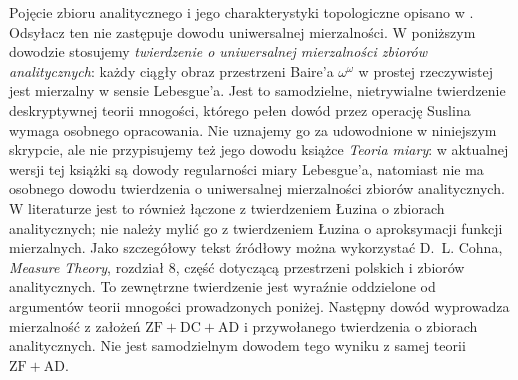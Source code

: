 \begin{uwaga}
\label{rem:ad-analytic-input}
Pojęcie zbioru analitycznego i jego charakterystyki topologiczne opisano w . Odsyłacz ten nie zastępuje dowodu uniwersalnej mierzalności.
W poniższym dowodzie stosujemy \emph{twierdzenie
o uniwersalnej mierzalności zbiorów analitycznych}:
każdy ciągły obraz przestrzeni Baire'a $\omega^\omega$
w prostej rzeczywistej jest mierzalny w sensie
Lebesgue'a. Jest to samodzielne, nietrywialne
twierdzenie deskryptywnej teorii mnogości,
którego pełen dowód przez operację Suslina
wymaga osobnego opracowania. Nie uznajemy go
za udowodnione w niniejszym skrypcie, ale nie
przypisujemy też jego dowodu książce \emph{Teoria miary}:
w aktualnej wersji tej książki są dowody regularności
miary Lebesgue'a, natomiast nie ma osobnego dowodu
twierdzenia o uniwersalnej mierzalności zbiorów analitycznych.
W literaturze jest to również łączone z twierdzeniem
Łuzina o zbiorach analitycznych; nie należy mylić go
z twierdzeniem Łuzina o aproksymacji funkcji mierzalnych.
Jako szczegółowy tekst źródłowy można wykorzystać
D.~L. Cohna, \emph{Measure Theory}, rozdział 8,
część dotyczącą przestrzeni polskich i zbiorów analitycznych.
To zewnętrzne twierdzenie jest wyraźnie oddzielone od
argumentów teorii mnogości prowadzonych poniżej.
Następny dowód wyprowadza mierzalność
z założeń $\mathrm{ZF}+\mathrm{DC}+\mathrm{AD}$
i przywołanego twierdzenia o zbiorach analitycznych.
Nie jest samodzielnym dowodem tego wyniku
z samej teorii $\mathrm{ZF}+\mathrm{AD}$.
\end{uwaga}

